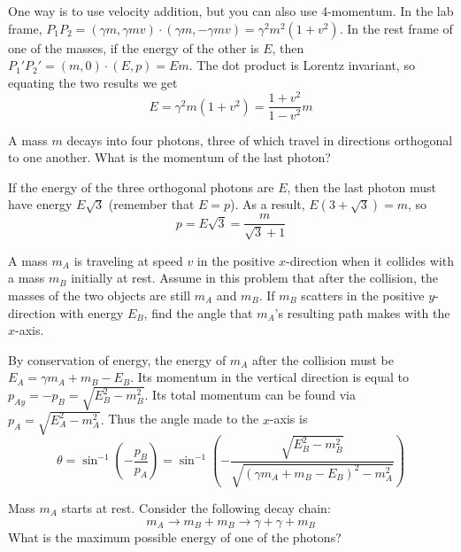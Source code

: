 \documentclass[11pt]{scrartcl}
\begin{document}
\begin{sol}
    One way is to use velocity addition, but you can also use 4-momentum. In the lab frame, $P_1P_2=(\gamma m,\gamma mv)\cdot(\gamma m,-\gamma mv)=\gamma^2m^2(1+v^2)$. In the rest frame of one of the masses, if the energy of the other is $E$, then $P_1'P_2'=(m,0)\cdot (E,p)=Em$. The dot product is Lorentz invariant, so equating the two results we get $$E=\gamma^2m(1+v^2)=\boxed{\frac{1+v^2}{1-v^2}m}$$
\end{sol}

\begin{prob}
    A mass $m$ decays into four photons, three of which travel in directions orthogonal to one another. What is the momentum of the last photon?
\end{prob}

\begin{sol}
    If the energy of the three orthogonal photons are $E$, then the last photon must have energy $E\sqrt 3$ (remember that $E=p$). As a result, $E(3+\sqrt 3)=m$, so $$p=E\sqrt 3=\boxed{\frac{m}{\sqrt 3+1}}$$
\end{sol}

\begin{prob}
    A mass $m_A$ is traveling at speed $v$ in the positive $x$-direction when it collides with a mass $m_B$ initially at rest. Assume in this problem that after the collision, the masses of the two objects are still $m_A$ and $m_B$. If $m_B$ scatters in the positive $y$-direction with energy $E_B$, find the angle that $m_A$'s resulting path makes with the $x$-axis.
\end{prob}

\begin{sol}
    By conservation of energy, the energy of $m_A$ after the collision must be $E_A=\gamma m_A+m_B-E_B$. Its momentum in the vertical direction is equal to $p_{Ay}=-p_B=\sqrt{E_B^2-m_B^2}$. Its total momentum can be found via $p_A=\sqrt{E_A^2-m_A^2}.$ Thus the angle made to the $x$-axis is $$\theta=\sin^{-1}\left(-\frac{p_B}{p_A}\right)=\boxed{\sin^{-1}\left(-\frac{\sqrt{E_B^2-m_B^2}}{\sqrt{(\gamma m_A+m_B-E_B)^2-m_A^2}}\right)}$$
\end{sol}

\begin{prob}
    Mass $m_A$ starts at rest. Consider the following decay chain: $$m_A\rightarrow m_B+m_B\rightarrow \gamma+\gamma+m_B$$ What is the maximum possible energy of one of the photons?
\end{prob}
\end{document}
